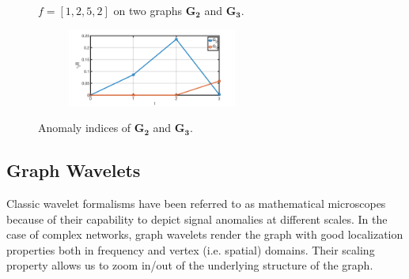 \documentclass[twoside,leqno,twocolumn]{article}
\begin{document}
\begin{figure}[t]
	\centering
    \vspace{-2mm}
	\caption{$f=[1,2,5,2]$ on two graphs $\mathbf{G_2}$ and $\mathbf{G_3}$.}
	\label{fig:f_on_g}
\end{figure}

\begin{figure}[t]
	\centering
    {
		\includegraphics[width= 3in,height=1in] {figures/new_graph.png}
		\label{fig:distribution2}
	}
    \vspace{-2mm}
	\caption{Anomaly indices of $\mathbf{G_2}$ and $\mathbf{G_3}$.}
	\label{fig:new_graph}
\end{figure}


\subsection{Graph Wavelets}
\label{sec:graph_wavelet}
Classic wavelet formalisms have been
referred to as
mathematical microscopes because of their capability to depict
signal anomalies at different scales. In the case of complex networks, graph wavelets render the graph with good localization properties both in frequency and vertex (i.e. spatial) domains. Their scaling property allows us to zoom in/out of the underlying structure of the graph.
\end{document}
